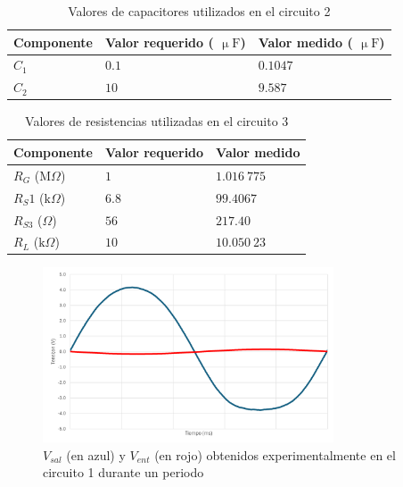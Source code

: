 \documentclass[journal]{IEEEtran}
\begin{document}
\begin{table}[H]
        \renewcommand{\arraystretch}{1.5}
        \caption{Valores de capacitores utilizados en el circuito 2}
        \centering
        \begin{tabular}{ >{\centering\arraybackslash}m{2.5cm} >{\centering\arraybackslash}m{2.65cm} >{\centering\arraybackslash}m{2.5cm} }
                \hline
            Componente & Valor requerido ( $\upmu\mathrm{F}$) & Valor medido ( $\upmu\mathrm{F}$) \\ 
            \hline
            $C_1$ & $0.1$ & $0.1047$  \\ 
            $C_2$ & $10$  & $9.587$  \\
            \hline
        \end{tabular}
        \label{tabla4}
    \end{table}

\begin{table}[H]
        \renewcommand{\arraystretch}{1.5}
        \caption{Valores de resistencias utilizadas en el circuito 3}
        \centering
        \begin{tabular}{ >{\centering\arraybackslash}m{2.5cm} >{\centering\arraybackslash}m{2.5cm} >{\centering\arraybackslash}m{2.5cm} }
                \hline
            Componente & Valor requerido & Valor medido\\ 
            \hline
            $R_G$ ($\mathrm{M}\Omega$) & $1$  & $1.016~775$  \\ 
            $R_S1$ ($\mathrm{k}\Omega$) & $6.8$  & $99.4067$  \\
            $R_{S3}$ ($\Omega$) & $56$  & $217.40$  \\
            $R_L$ ($\mathrm{k}\Omega$) & $10$  & $10.050~23$  \\
            \hline
        \end{tabular}
        \label{tabla5}
    \end{table}


\begin{figure}[H]
        \centering
        \includegraphics[width=3.4in]{C1111.png}
        \caption{$V_{sal}$ (en azul) y $V_{ent}$ (en rojo) obtenidos experimentalmente en el circuito 1 durante un periodo}
        \label{fig:SignalExperimental_02}
\end{figure}
\end{document}
